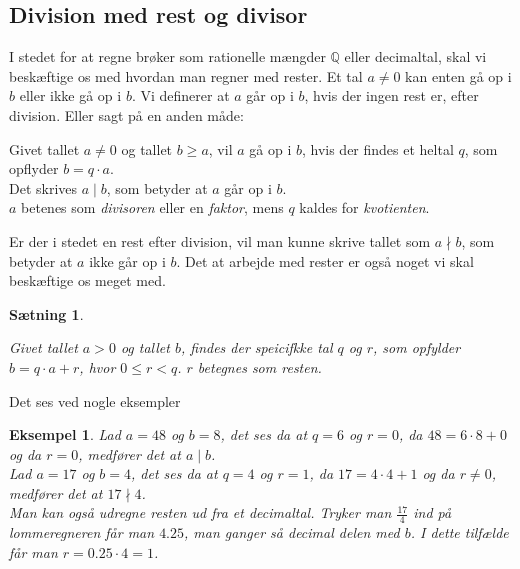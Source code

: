 \documentclass[a4paper, 12pt]{article}
\theoremstyle{break}
\newtheorem{eks}[definition]{Eksempel}
\theoremstyle{breakline}
\newtheorem{sentence}[definition]{Sætning}
\newenvironment{sent}
    {\begin{sentence}\mbox{}\begin{adjustwidth}{1em}{1em}}
    {\end{adjustwidth}\par\noindent\hrulefill\end{sentence}}
\theoremstyle{beviser}
\begin{document}
    \subsection{Division med rest og divisor}
    I stedet for at regne brøker som rationelle mængder \(\mathbb{Q}\) eller decimaltal, skal vi beskæftige os med hvordan man regner med rester.
    Et tal \(a \neq 0\) kan enten gå op i \(b\) eller ikke gå op i \(b\).
    Vi definerer at \(a\) går op i \(b\), hvis der ingen rest er, efter division. Eller sagt på en anden måde:


    \begin{definition}
        Givet tallet \(a \neq 0\) og tallet \(b \geq a\), vil \(a\) gå op i \(b\),
        hvis der findes et heltal \(q\), som opflyder \(b=q \cdot a\).\\
        Det skrives \(a \mid b\), som betyder at \(a\) går op i \(b\).\\
        \(a\) betenes som \textit{divisoren} eller en \textit{faktor},
        mens \(q\) kaldes for \textit{kvotienten}.\cite[70]{krypto}
    \end{definition}

    Er der i stedet en rest efter division, vil man kunne skrive tallet som \(a \nmid b\), som betyder at \(a\) ikke går op i \(b\).
    Det at arbejde med rester er også noget vi skal beskæftige os meget med.

    \begin{sent}
        Givet tallet \(a > 0\) og tallet \(b\), findes der speicifkke tal \(q\) og \(r\), som opfylder \(b=q \cdot a + r\), hvor \(0 \leq r < q\). \(r\) betegnes som \textit{resten}.
    \end{sent}

    Det ses ved nogle eksempler

    \begin{eks}
        Lad \(a = 48\) og \(b = 8\), det ses da at \(q = 6\) og \(r = 0\), da \(48 = 6 \cdot 8 + 0\) og da \(r = 0\), medfører det at \(a \mid b\).\\

        Lad \(a = 17\) og \(b = 4\), det ses da at \(q = 4\) og \(r = 1\), da \(17 = 4 \cdot 4 + 1\) og da \(r \neq 0\), medfører det at \(17 \nmid 4\).\\

        Man kan også udregne resten ud fra et decimaltal.
        Tryker man \(\frac{17}{4}\) ind på lommeregneren får man \(4.25\), man ganger så decimal delen med \(b\).
        I dette tilfælde får man \(r = 0.25 \cdot 4 = 1\).
    \end{eks}
\end{document}
